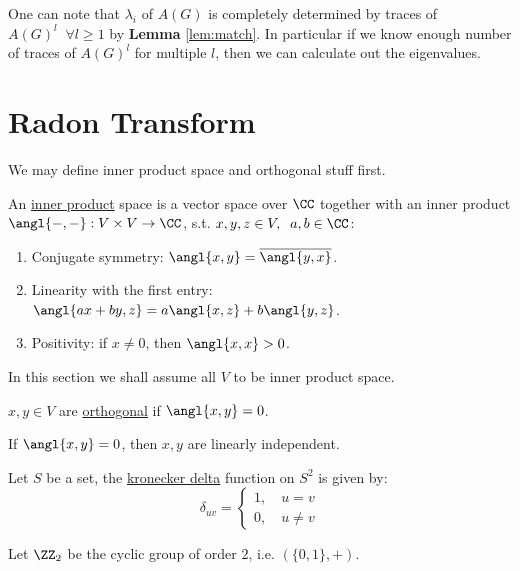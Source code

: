 One can note that \( \lambda_i \) of \( A(G) \) is completely determined by traces of \( A(G)^l \; \; \forall l \geq 1\) by \textbf{Lemma} \ref{lem:match}. In particular if we know enough number of traces of \( A(G)^l \) for multiple \( l \), then we can calculate out the eigenvalues.

\section{Radon Transform}

We may define inner product space and orthogonal stuff first.

\begin{definition}
	An \underline{inner product} space is a vector space over \( \CC \) together with an inner product \( \angl{-,-}: V \times V \to \CC \), s.t. \( x,y,z \in V, \; \; a,b \in \CC \):
	\begin{enumerate}
		\item Conjugate symmetry: \( \angl{x,y} = \overline{\angl{y,x}} \).
		\item Linearity with the first entry: \( \angl{ax+by, z} = a\angl{x,z} + b\angl{y,z} \).
		\item Positivity: if \( x\ne 0 \), then \( \angl{x,x} > 0 \).
	\end{enumerate}
\end{definition}

In this section we shall assume all \( V \) to be inner product space.

\begin{definition}
	\( x,y \in V \) are \underline{orthogonal} if \( \angl{x,y} = 0 \).
\end{definition}

\begin{lemma}
	If \( \angl{x,y} = 0 \), then \( x,y \) are linearly independent.
\end{lemma}

\begin{definition}
	Let \( S \) be a set, the \underline{kronecker delta} function on \( S^2 \) is given by:
	\[
		\delta_{uv} =
		\begin{cases}
			1, \quad u=v \\
			0, \quad u\ne v
		\end{cases}
	\]
\end{definition}

Let \( \ZZ_2 \) be the cyclic group of order \( 2 \), i.e. \( (\{0,1\}, +) \).


